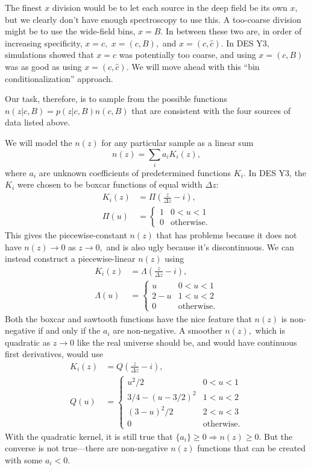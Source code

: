 \documentclass[11pt,preprint,flushrt]{aastex631}
\begin{document}
The finest $x$ division would be to let each source in the deep field
be its own $x,$ but we clearly don't have enough spectroscopy to use
this.  A too-coarse division might be to use the wide-field bins, $x=B$.
In between these two are, in order of increasing specificity,
$x=c,$ $x=(c,B),$ and $x=(c,\hat c).$  In DES Y3, simulations showed
that $x=c$ was potentially too coarse, and using $x=(c,B)$ was as good
as using $x=(c,\hat c).$   We will move ahead with this ``bin
conditionalization'' approach.

Our task, therefore, is to sample from the possible functions
$n(z|c,B)=p(z|c,B) n(c,B)$ that are consistent with the four sources
of data listed above.

We will model the $n(z)$ for any particular sample as a linear sum
\begin{equation}
  n(z) = \sum_i a_i K_i(z),
\end{equation}
where $a_i$ are unknown coefficients of predetermined functions $K_i.$
In DES Y3, the $K_i$ were chosen to be boxcar functions of equal width
$\Delta z$:
\begin{align}
  K_i(z) & = \Pi\left(\frac{z}{\Delta z}-i\right), \\
  \Pi(u) & = \begin{cases}
    1 & 0<u<1 \\
    0 & \text{otherwise.}
  \end{cases}
\end{align}
This gives the piecewise-constant $n(z)$ that has problems because it
does not have $n(z)\rightarrow 0$ as $z\rightarrow0,$ and is also ugly
because it's discontinuous.  We can instead construct a
piecewise-linear $n(z)$ using
\begin{align}
  K_i(z) & = \Lambda\left(\frac{z}{\Delta z}-i\right), \\
  \Lambda(u) & = \begin{cases}
    u & 0<u<1 \\
    2-u & 1<u<2 \\
    0 & \text{otherwise.}
  \end{cases}
\end{align}
Both the boxcar and sawtooth functions have the nice feature that
$n(z)$ is non-negative if and only if the $a_i$ are non-negative.  A
smoother $n(z),$ which is quadratic as $z\rightarrow 0$ like the real
universe should be, and would have continuous first derivatives, would
use
\begin{align}
  K_i(z) & = Q\left(\frac{z}{\Delta z}-i\right), \\
  Q(u) & = \begin{cases}
    u^2/2 & 0<u<1 \\
    3/4 - \left(u-3/2\right)^2 & 1<u<2 \\
    (3-u)^2/2  & 2<u<3 \\
    0 & \text{otherwise.}
  \end{cases}
\end{align}
With the quadratic kernel, it is still true that $\{a_i\}\ge 0
\Rightarrow n(z) \ge 0.$  But the converse is not true---there are
non-negative $n(z)$ functions that can be created with some $a_i<0.$
\end{document}
